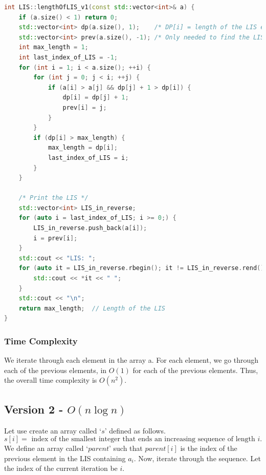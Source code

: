 \documentclass[12pt, a4paper]{article}
\theoremstyle{definition}
\theoremstyle{remark}
\begin{document}
\begin{lstlisting}[language=C++]
int LIS::lengthOfLIS_v1(const std::vector<int>& a) {
    if (a.size() < 1) return 0;
    std::vector<int> dp(a.size(), 1);    /* DP[i] = length of the LIS ending with a[i] */
    std::vector<int> prev(a.size(), -1); /* Only needed to find the LIS itself in addition to its length */
    int max_length = 1;
    int last_index_of_LIS = -1;
    for (int i = 1; i < a.size(); ++i) {
        for (int j = 0; j < i; ++j) {
            if (a[i] > a[j] && dp[j] + 1 > dp[i]) {
                dp[i] = dp[j] + 1;
                prev[i] = j;
            }
        }
        if (dp[i] > max_length) {
            max_length = dp[i];
            last_index_of_LIS = i;
        }
    }

    /* Print the LIS */
    std::vector<int> LIS_in_reverse;
    for (auto i = last_index_of_LIS; i >= 0;) {
        LIS_in_reverse.push_back(a[i]);
        i = prev[i];
    }
    std::cout << "LIS: ";
    for (auto it = LIS_in_reverse.rbegin(); it != LIS_in_reverse.rend(); ++it) {
        std::cout << *it << " ";
    }
    std::cout << "\n";
    return max_length;  // Length of the LIS
}
\end{lstlisting}

\subsubsection{Time Complexity}
We iterate through each element in the array a. For each element, we go through each of the previous elements, in $O(1)$ for each of the previous elements. Thus, the overall time complexity is $O(n^2)$.

\subsection{Version 2 - $O(n \log n)$}
Let use create an array called `$s$' defined as follows.
\begin{equation}
    s[i] = \text{ index of the smallest integer that ends an increasing sequence of length } i.
\end{equation}
% 
We define an array called `$parent$' such that $parent[i]$ is the index of the previous element in the LIS containing $a_i$.
Now, iterate through the sequence. Let the index of the current iteration be $i$.
\end{document}
